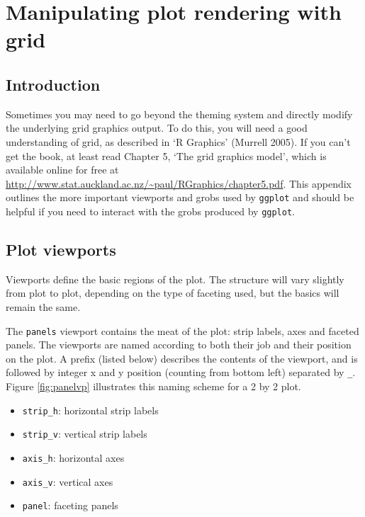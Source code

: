 \chapter{Manipulating plot rendering with grid}\label{cha:grid}

\section{Introduction}

Sometimes you may need to go beyond the theming system and directly
modify the underlying grid graphics output. To do this, you will need a
good understanding of grid, as described in `R Graphics' (Murrell 2005).
If you can't get the book, at least read Chapter 5, `The grid graphics
model', which is available online for free at
\url{http://www.stat.auckland.ac.nz/~paul/RGraphics/chapter5.pdf}. This
appendix outlines the more important viewports and grobs used by
\texttt{ggplot} and should be helpful if you need to interact with the
grobs produced by \texttt{ggplot}.  

\section{Plot viewports}\label{sec:plot-viewports}

Viewports define the basic regions of the plot. The structure will vary
slightly from plot to plot, depending on the type of faceting used, but
the basics will remain the same. 

The \texttt{panels} viewport contains the meat of the plot: strip
labels, axes and faceted panels. The viewports are named according to
both their job and their position on the plot. A prefix (listed below)
describes the contents of the viewport, and is followed by integer x and
y position (counting from bottom left) separated by \texttt{\_}. Figure
\ref{fig:panelvp} illustrates this naming scheme for a 2 by 2 plot.

\begin{itemize}
\itemsep1pt\parskip0pt
\item
  \texttt{strip\_h}: horizontal strip labels
\item
  \texttt{strip\_v}: vertical strip labels
\item
  \texttt{axis\_h}: horizontal axes
\item
  \texttt{axis\_v}: vertical axes
\item
  \texttt{panel}: faceting panels
\end{itemize}

